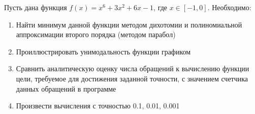 \documentclass[../body.tex]{subfiles}
\begin{document}
Пусть дана функция $f(x)=x^6+3x^2+6x-1$, где $x \in [-1,0]$. Необходимо:
\begin{enumerate}
    \item Найти минимум данной функции методом дихотомии и полиномиальной аппроксимации второго порядка (методом парабол)
    \item Проиллюстрировать унимодальность функции графиком
    \item Сравнить аналитическую оценку числа обращений к вычислению функции цели, требуемое для достижения заданной точности, с значением счетчика данных обращений в программе
    \item Произвести вычисления с точностью 0.1, 0.01, 0.001
\end{enumerate}
\end{document}
